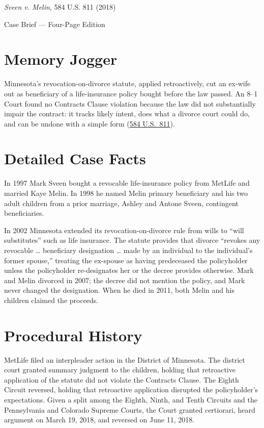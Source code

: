 \documentclass[12pt]{article}
\begin{document}
\begin{center}
{\LARGE \textit{Sveen v. Melin}, 584 U.S. 811 (2018)\par}
\vspace{0.8em}
{\large Case Brief --- Four-Page Edition\par}
\end{center}
\vspace{1em}

\section{Memory Jogger}

Minnesota's revocation-on-divorce statute, applied retroactively, cut an ex-wife out as beneficiary of a life-insurance policy bought before the law passed. An 8--1 Court found no Contracts Clause violation because the law did not substantially impair the contract: it tracks likely intent, does what a divorce court could do, and can be undone with a simple form (\href{https://supreme.justia.com/cases/federal/us/584/16-1432/}{584 U.S.\ 811}).

\section{Detailed Case Facts}

In 1997 Mark Sveen bought a revocable life-insurance policy from MetLife and married Kaye Melin. In 1998 he named Melin primary beneficiary and his two adult children from a prior marriage, Ashley and Antone Sveen, contingent beneficiaries.

In 2002 Minnesota extended its revocation-on-divorce rule from wills to ``will substitutes'' such as life insurance. The statute provides that divorce ``revokes any revocable \ldots{} beneficiary designation \ldots{} made by an individual to the individual's former spouse,'' treating the ex-spouse as having predeceased the policyholder unless the policyholder re-designates her or the decree provides otherwise. Mark and Melin divorced in 2007; the decree did not mention the policy, and Mark never changed the designation. When he died in 2011, both Melin and his children claimed the proceeds.

\section{Procedural History}

MetLife filed an interpleader action in the District of Minnesota. The district court granted summary judgment to the children, holding that retroactive application of the statute did not violate the Contracts Clause. The Eighth Circuit reversed, holding that retroactive application disrupted the policyholder's expectations. Given a split among the Eighth, Ninth, and Tenth Circuits and the Pennsylvania and Colorado Supreme Courts, the Court granted certiorari, heard argument on March 19, 2018, and reversed on June 11, 2018.
\end{document}
